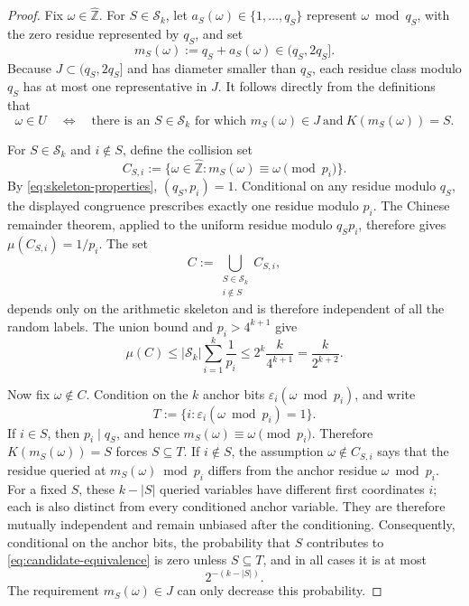 \documentclass[11pt]{article}
\numberwithin{equation}{section}
\theoremstyle{definition}
\theoremstyle{remark}
\newcommand{\Zh}{\widehat{\mathbb Z}}
\newcommand{\cS}{\mathcal S}
\begin{document}
\begin{proof}
Fix \(\omega\in\Zh\).  For \(S\in\cS_k\), let
\(a_S(\omega)\in\{1,\ldots,q_S\}\) represent \(\omega\bmod q_S\), with
the zero residue represented by \(q_S\), and set
\[
 m_S(\omega):=q_S+a_S(\omega)\in(q_S,2q_S].
\]
Because \(J\subset(q_S,2q_S]\) and has diameter smaller than \(q_S\),
each residue class modulo \(q_S\) has at most one representative in \(J\).
It follows directly from the definitions that
\begin{equation}\label{eq:candidate-equivalence}
 \omega\in U
 \quad\Longleftrightarrow\quad
 \text{there is an \(S\in\cS_k\) for which }
 m_S(\omega)\in J\ \text{and}\ K(m_S(\omega))=S.
\end{equation}

For \(S\in\cS_k\) and \(i\notin S\), define the collision set
\[
 C_{S,i}:=\{\omega\in\Zh:
       m_S(\omega)\equiv\omega\pmod {p_i}\}.
\]
By \eqref{eq:skeleton-properties}, \((q_S,p_i)=1\).  Conditional on any
residue modulo \(q_S\), the displayed congruence prescribes exactly one
residue modulo \(p_i\).  The Chinese remainder theorem, applied to the
uniform residue modulo \(q_Sp_i\), therefore gives
\(\mu(C_{S,i})=1/p_i\).  The set
\[
 C:=\bigcup_{\substack{S\in\cS_k\\i\notin S}}C_{S,i},
\]
depends only on the arithmetic skeleton and is therefore independent of all
the random labels.  The union bound and \(p_i>4^{k+1}\) give
\begin{equation}\label{eq:collision-bound}
 \mu(C)
 \le|\cS_k|\sum_{i=1}^k\frac1{p_i}
 \le2^k\frac{k}{4^{k+1}}
 =\frac{k}{2^{k+2}}.
\end{equation}

Now fix \(\omega\notin C\).  Condition on the \(k\) anchor bits
\(\varepsilon_i(\omega\bmod p_i)\), and write
\[
 T:=\{i:\varepsilon_i(\omega\bmod p_i)=1\}.
\]
If \(i\in S\), then \(p_i\mid q_S\), and hence
\(m_S(\omega)\equiv\omega\pmod {p_i}\).  Therefore
\(K(m_S(\omega))=S\) forces \(S\subseteq T\).  If \(i\notin S\), the
assumption \(\omega\notin C_{S,i}\) says that the residue queried at
\(m_S(\omega)\bmod p_i\) differs from the anchor residue
\(\omega\bmod p_i\).  For a fixed \(S\), these \(k-|S|\) queried variables
have different first coordinates \(i\); each is also distinct from every
conditioned anchor variable.  They are therefore mutually independent and
remain unbiased after the conditioning.  Consequently, conditional
on the anchor bits, the probability that \(S\) contributes to
\eqref{eq:candidate-equivalence} is zero unless \(S\subseteq T\), and in
all cases it is at most
\begin{equation}\label{eq:one-candidate}
 2^{-(k-|S|)}.
\end{equation}
The requirement \(m_S(\omega)\in J\) can only decrease this probability.


\end{proof}
\end{document}
